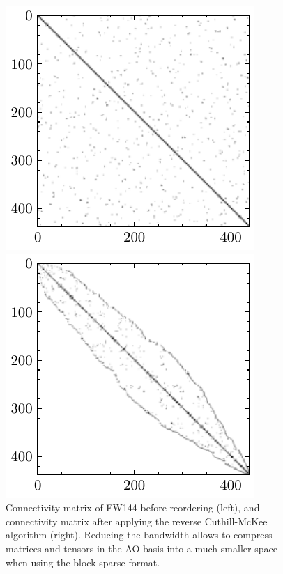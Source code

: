 \begin{figure}
\centering
\begin{minipage}{0.45\textwidth}
\centering
\includegraphics[width=\textwidth]{Pics/FW144_UNORDERED}
\end{minipage}
\begin{minipage}{0.45\textwidth}
\centering
\includegraphics[width=\textwidth]{Pics/FW144_ORDERED}
\end{minipage}
\caption{Connectivity matrix of FW144 before reordering (left), and connectivity matrix after applying the reverse Cuthill-McKee algorithm (right). Reducing the bandwidth allows to compress matrices and tensors in the AO basis into a much smaller space when using the block-sparse format.}
\label{fig:RCM}
\end{figure}

